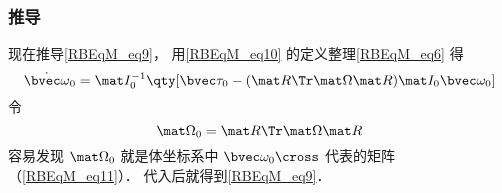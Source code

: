 \subsubsection{推导}
现在推导\autoref{RBEqM_eq9}， 用\autoref{RBEqM_eq10} 的定义整理\autoref{RBEqM_eq6} 得
\begin{equation}
\dot{\bvec \omega}_0 = \mat I_0^{-1} \qty[\bvec \tau_0  - (\mat R\Tr\mat\Omega\mat R) \mat I_0 \bvec\omega_0]
\end{equation}
令
\begin{equation}
\mat\Omega_0 = \mat R\Tr\mat\Omega\mat R
\end{equation}
容易发现 $\mat\Omega_0$ 就是体坐标系中 $\bvec\omega_0\cross$ 代表的矩阵（\autoref{RBEqM_eq11}）． 代入后就得到\autoref{RBEqM_eq9}．
